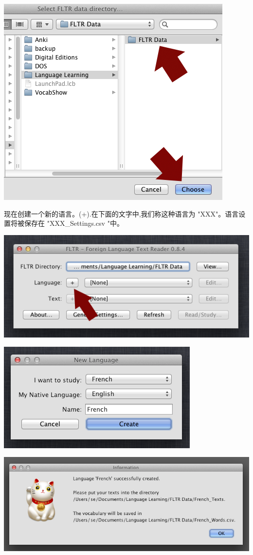 \documentclass[cn,10pt,math=newtx,citestyle=gb7714-2015,bibstyle=gb7714-2015]{elegantbook}
\begin{document}
\includegraphics[scale=0.6]{image/images-019.png}

现在创建一个新的语言。(+).在下面的文字中,我们称这种语言为 "XXX"。语言设置将被保存在 "XXX\_Settings.csv "中。

\includegraphics[scale=0.6]{image/images-021.png}

\includegraphics[scale=0.6]{image/images-023.png}

\includegraphics[scale=0.6]{image/images-024.png}
\end{document}
